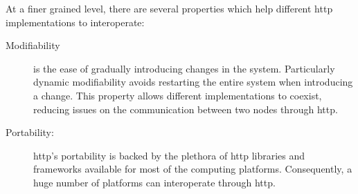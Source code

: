 At a finer grained level, there are several properties which help different \ac{http} implementations to interoperate: %
\begin{description}
  \item[Modifiability] is the ease of gradually introducing changes in the system.
                       Particularly dynamic modifiability avoids restarting the entire system when introducing a change.
                       This property allows different implementations to coexist,
                       reducing issues on the communication between two nodes through \ac{http}.
                       
  
  \item[Portability:] \ac{http}'s portability is backed by the plethora of \ac{http} libraries and frameworks available for most of the computing platforms.
                    Consequently, a huge number of platforms can interoperate through \ac{http}.
\end{description}



